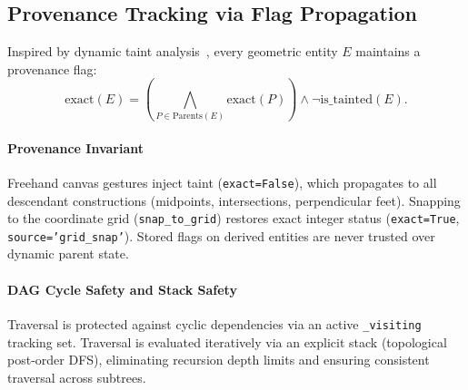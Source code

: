 \documentclass[preprint,12pt]{elsarticle}
\begin{document}
\subsection{Provenance Tracking via Flag Propagation}
Inspired by dynamic taint analysis~\cite{schwartz2010}, every geometric entity $E$ maintains a provenance flag:
\begin{equation}
\label{eq:taint}
\text{exact}(E) = \left(\bigwedge_{P \in \text{Parents}(E)} \text{exact}(P)\right) \land \neg \text{is\_tainted}(E).
\end{equation}
\paragraph{Provenance Invariant} Freehand canvas gestures inject taint (\texttt{exact=False}), which propagates to all descendant constructions (midpoints, intersections, perpendicular feet). Snapping to the coordinate grid (\texttt{snap\_to\_grid}) restores exact integer status (\texttt{exact=True}, \texttt{source='grid\_snap'}). Stored flags on derived entities are never trusted over dynamic parent state.

\paragraph{DAG Cycle Safety and Stack Safety} Traversal is protected against cyclic dependencies via an active \texttt{\_visiting} tracking set. Traversal is evaluated iteratively via an explicit stack (topological post-order DFS), eliminating recursion depth limits and ensuring consistent traversal across subtrees.
\end{document}
